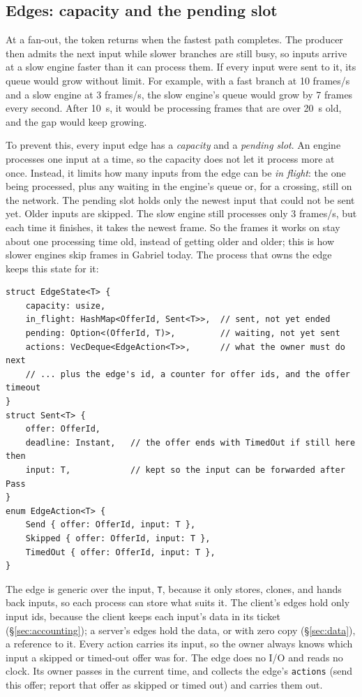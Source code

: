 \documentclass[11pt]{article}
\newcommand{\code}[1]{\texttt{#1}}
\begin{document}
\subsection{Edges: capacity and the pending slot}
\label{sec:edges}

At a fan-out, the token returns when the fastest path completes. The producer
then admits the next input while slower branches are still busy, so inputs
arrive at a slow engine faster than it can process them. If every input were
sent to it, its queue would grow without limit. For example, with a fast
branch at 10 frames/s and a slow engine at 3 frames/s, the slow engine's queue
would grow by 7 frames every second. After 10~s, it would be processing frames
that are over 20~s old, and the gap would keep growing.

To prevent this, every input edge has a \emph{capacity} and a \emph{pending
slot}. An engine processes one input at a time, so the capacity does not let
it process more at once. Instead, it limits how many inputs from the edge can
be \emph{in flight}: the one being processed, plus any waiting in the
engine's queue or, for a crossing, still on the network. The pending slot
holds only the newest input that could not be sent yet. Older inputs are skipped.
The slow engine still processes only 3 frames/s, but each time it finishes, it
takes the newest frame. So the frames it works on stay about one processing
time old, instead of getting older and older; this is how slower engines skip
frames in Gabriel today. The process that owns the edge keeps this state for
it:

\begin{lstlisting}
struct EdgeState<T> {
    capacity: usize,
    in_flight: HashMap<OfferId, Sent<T>>,  // sent, not yet ended
    pending: Option<(OfferId, T)>,         // waiting, not yet sent
    actions: VecDeque<EdgeAction<T>>,      // what the owner must do next
    // ... plus the edge's id, a counter for offer ids, and the offer timeout
}
struct Sent<T> {
    offer: OfferId,
    deadline: Instant,   // the offer ends with TimedOut if still here then
    input: T,            // kept so the input can be forwarded after Pass
}
enum EdgeAction<T> {
    Send { offer: OfferId, input: T },
    Skipped { offer: OfferId, input: T },
    TimedOut { offer: OfferId, input: T },
}
\end{lstlisting}

The edge is generic over the input, \code{T}, because it only stores, clones,
and hands back inputs, so each process can store what suits it. The client's
edges hold only input ids, because the client keeps each input's data in its
ticket (\S\ref{sec:accounting}); a server's edges hold the data, or with zero
copy (\S\ref{sec:data}), a reference to it. Every action carries its input, so
the owner always knows which input a skipped or timed-out offer was for. The edge does no I/O and reads no clock. Its owner passes in the
current time, and collects the edge's \code{actions} (send this offer; report
that offer as skipped or timed out) and carries them out.
\end{document}
